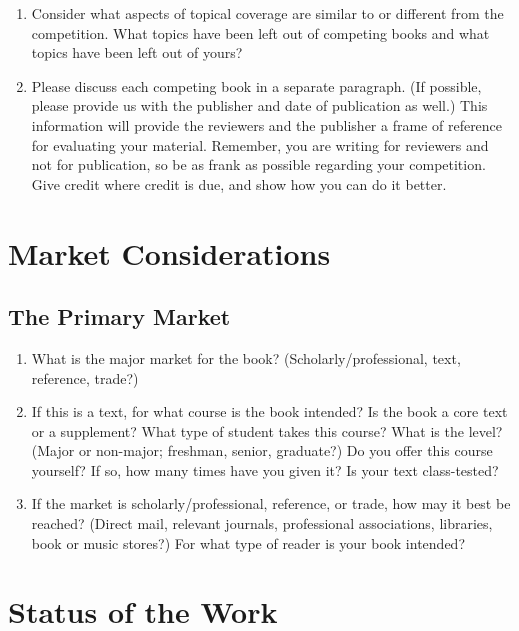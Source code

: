 \documentclass[10pt,dvipsnames,enabledeprecatedfontcommands]{scrartcl}
\begin{document}
\begin{enumerate}
\def\labelenumi{\alph{enumi}.}
\setcounter{enumi}{1}
\item
  Consider what aspects of topical coverage are similar to or different
  from the competition. What topics have been left out of competing
  books and what topics have been left out of yours?
\item
  Please discuss each competing book in a separate paragraph. (If
  possible, please provide us with the publisher and date of publication
  as well.) This information will provide the reviewers and the
  publisher a frame of reference for evaluating your material. Remember,
  you are writing for reviewers and not for publication, so be as frank
  as possible regarding your competition. Give credit where credit is
  due, and show how you can do it better.
\end{enumerate}

\hypertarget{market-considerations}{%
\section{Market Considerations}\label{market-considerations}}

\hypertarget{the-primary-market}{%
\subsection{The Primary Market}\label{the-primary-market}}

\begin{enumerate}
\def\labelenumi{\arabic{enumi}.}
\item
  What is the major market for the book? (Scholarly/professional, text,
  reference, trade?)
\item
  If this is a text, for what course is the book intended? Is the book a
  core text or a supplement? What type of student takes this course?
  What is the level? (Major or non-major; freshman, senior, graduate?)
  Do you offer this course yourself? If so, how many times have you
  given it? Is your text class-tested?
\item
  If the market is scholarly/professional, reference, or trade, how may
  it best be reached? (Direct mail, relevant journals, professional
  associations, libraries, book or music stores?) For what type of
  reader is your book intended?
\end{enumerate}

\hypertarget{status-of-the-work}{%
\section{Status of the Work}\label{status-of-the-work}}
\end{document}
